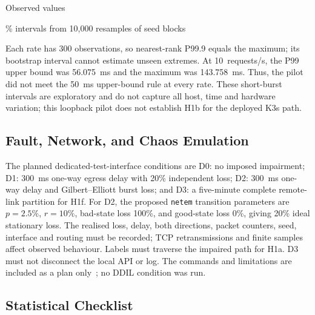 \documentclass{ieeeaccess}
\renewcommand{\textbf}[1]{#1}
\begin{document}
\begin{table}[t]
\caption{Laptop-VM loopback latency pilot: 30 seeds, 300 requests per rate, and 95\% seed-bootstrap intervals}
\label{tab:latency_pilot}
\centering
\small
\textbf{Observed values}\par\smallskip


\medskip
\textbf{95\% intervals from 10,000 resamples of seed blocks}\par\smallskip

\end{table}

Each rate has 300 observations, so nearest-rank P99.9 equals the maximum; its bootstrap interval cannot estimate unseen extremes. At 10~requests/s, the P99 upper bound was 56.075~ms and the maximum was 143.758~ms. Thus, the pilot did not meet the 50~ms upper-bound rule at every rate. These short-burst intervals are exploratory and do not capture all host, time and hardware variation; this loopback pilot does not establish H1b for the deployed K3s path.

\subsection{Fault, Network, and Chaos Emulation}
\label{subsec:chaos}

The planned dedicated-test-interface conditions are D0: no imposed impairment; D1: 300~ms one-way egress delay with 20\% independent loss; D2: 300~ms one-way delay and Gilbert--Elliott burst loss; and D3: a five-minute complete remote-link partition for H1f. For D2, the proposed \texttt{netem} transition parameters are $p=2.5\%$, $r=10\%$, bad-state loss 100\%, and good-state loss 0\%, giving 20\% ideal stationary loss. The realised loss, delay, both directions, packet counters, seed, interface and routing must be recorded; TCP retransmissions and finite samples affect observed behaviour. Labels must traverse the impaired path for H1a. D3 must not disconnect the local API or log. The commands and limitations are included as a plan only~\cite{b_netem}; no DDIL condition was run.

\subsection{Statistical Checklist}
\label{subsec:stats}
\end{document}
